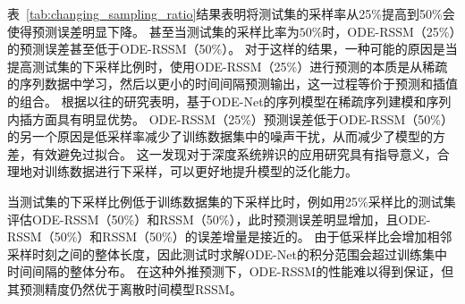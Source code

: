 表~\ref{tab:changing_sampling_ratio}结果表明将测试集的采样率从25\%提高到50\%会使得预测误差明显下降。
甚至当测试集的采样比率为$50\%$时，ODE-RSSM（25\%）的预测误差甚至低于ODE-RSSM（50\%）。
对于这样的结果，一种可能的原因是当提高测试集的下采样比例时，使用ODE-RSSM（25\%）进行预测的本质是从稀疏的序列数据中学习，然后以更小的时间间隔预测输出，这一过程等价于预测和插值的组合。
根据以往的研究\cite{Yildiz2019}表明，基于ODE-Net的序列模型在稀疏序列建模和序列内插方面具有明显优势。
ODE-RSSM（25\%）预测误差低于ODE-RSSM（50\%）的另一个原因是低采样率减少了训练数据集中的噪声干扰，从而减少了模型的方差，有效避免过拟合。
这一发现对于深度系统辨识的应用研究具有指导意义，合理地对训练数据进行下采样，可以更好地提升模型的泛化能力。

当测试集的下采样比例低于训练数据集的下采样比时，例如用25\%采样比的测试集评估ODE-RSSM（50\%）和RSSM（50\%），此时预测误差明显增加，且ODE-RSSM（50\%）和RSSM（50\%）的误差增量是接近的。
由于低采样比会增加相邻采样时刻之间的整体长度，因此测试时求解ODE-Net的积分范围会超过训练集中时间间隔的整体分布。
在这种外推预测下，ODE-RSSM的性能难以得到保证，但其预测精度仍然优于离散时间模型RSSM。

